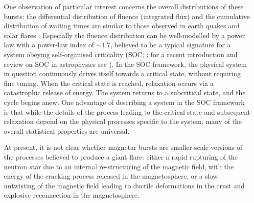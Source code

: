 \documentclass[12pt]{emulateapj}
\begin{document}
One observation of particular interest concerns the overall distributions of these bursts: the differential distribution of fluence (integrated flux) and 
the cumulative distribution of waiting times are similar to those observed in earth quakes and solar flares \citep{cheng1996}. Especially the fluence distribution
can be well-modelled by a power law with a power-law index of $\sim 1.7$, believed to be a typical signature for a system obeying 
self-organised criticality (SOC; \citealp{bak1987,bak1988}; for a recent introduction and review on SOC in astrophysics see \citealp{aschwanden2014}). 
In the SOC framework, the physical system in question continuously drives itself towards a critical state,
without requiring fine tuning. When the critical state is reached, relaxation occurs via a catastrophic release of energy. The system returns
to a subcritical state, and the cycle begins anew. %
One advantage of describing a system in the SOC framework is that while the details of the process leading to the critical state and subsequent
relaxation depend on the physical processes specific to the system, many of the overall statistical properties are universal.

At present, it is not clear whether magnetar bursts are smaller-scale versions of the processes believed to produce a giant flare:
either a rapid rupturing of the neutron star due to an internal re-structuring of the magnetic field, with the energy of the cracking process
released in the magnetosphere, or a slow untwisting of the magnetic field leading to ductile deformations in the crust and explosive 
reconnection in the magnetosphere.

\end{document}
